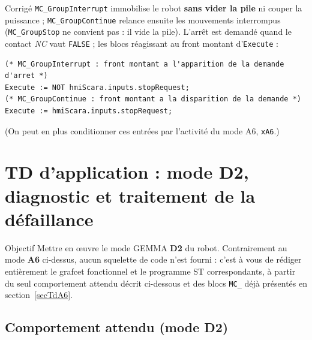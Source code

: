 \begin{UPSTIactivite}

\begin{UPSTIcorrectionP}{Corrigé}
\texttt{MC\_GroupInterrupt} immobilise le robot \textbf{sans vider la pile}
ni couper la puissance ; \texttt{MC\_GroupContinue} relance ensuite les
mouvements interrompus (\texttt{MC\_GroupStop} ne convient pas : il vide
la pile). L'arrêt est demandé quand le contact \emph{NC} vaut
\texttt{FALSE} ; les blocs réagissant au front montant d'\texttt{Execute} :
\begin{lstlisting}
(* MC_GroupInterrupt : front montant a l'apparition de la demande d'arret *)
Execute := NOT hmiScara.inputs.stopRequest;
(* MC_GroupContinue : front montant a la disparition de la demande *)
Execute := hmiScara.inputs.stopRequest;
\end{lstlisting}
(On peut en plus conditionner ces entrées par l'activité du mode A6,
\texttt{xA6}.)
\end{UPSTIcorrectionP}
\end{UPSTIactivite}

\section{TD d'application : mode D2, diagnostic et traitement de la défaillance}
\label{secTdD2}

\begin{UPSTIinfor}{Objectif}
Mettre en œuvre le mode GEMMA \textbf{D2} du robot. Contrairement au mode
\textbf{A6} ci-dessus, aucun squelette de code n'est fourni : c'est à vous
de rédiger entièrement le grafcet fonctionnel et le programme ST
correspondants, à partir du seul comportement attendu décrit ci-dessous et
des blocs \texttt{MC\_} déjà présentés en section~\ref{secTdA6}.
\end{UPSTIinfor}

\subsection{Comportement attendu (mode D2)}

